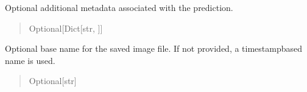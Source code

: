 \documentclass[letterpaper,10pt,english]{sphinxmanual}
\begin{document}
\begin{fulllineitems}
\begin{fulllineitems}
\begin{quote}
\begin{description}
\end{description}\end{quote}

\end{fulllineitems}


\begin{fulllineitems}
\label{\detokenize{modules/src.pig_sorting_api.main:src.pig_sorting_api.main.SavePredictionRequest.metadata}}
\pysigstartsignatures
\pysigline
{}
\pysigstopsignatures
\sphinxAtStartPar
Optional additional metadata
associated with the prediction.
\begin{quote}\begin{description}
\sphinxAtStartPar
Optional{[}Dict{[}str, {\hyperref[\detokenize{modules/src.pig_sorting_api.main:src.pig_sorting_api.main.Any}]{}}{]}{]}

\end{description}\end{quote}

\end{fulllineitems}


\begin{fulllineitems}
\label{\detokenize{modules/src.pig_sorting_api.main:src.pig_sorting_api.main.SavePredictionRequest.ImageName}}
\pysigstartsignatures
\pysigline
{}
\pysigstopsignatures
\sphinxAtStartPar
Optional base name for the saved image
file. If not provided, a timestamp\sphinxhyphen{}based name is used.
\begin{quote}\begin{description}
\sphinxAtStartPar
Optional{[}str{]}

\end{description}\end{quote}

\end{fulllineitems}



\end{fulllineitems}
\end{document}
